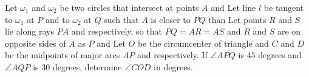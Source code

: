 Let $\omega_1$ and $\omega_2$ be two circles that intersect at points $A$ and  Let line $l$ be tangent to $\omega_1$ at $P$ and to $\omega_2$ at $Q$ such that $A$ is closer to $PQ$ than  Let points $R$ and $S$ lie along rays $PA$ and  respectively, so that $PQ = AR = AS$ and $R$ and $S$ are on opposite sides of $A$ as $P$ and  Let $O$ be the circumcenter of triangle  and $C$ and $D$ be the midpoints of major arcs $AP$ and  respectively. If $\angle APQ$ is $45$ degrees and $\angle AQP$ is $30$ degrees, determine $\angle COD$ in degrees.